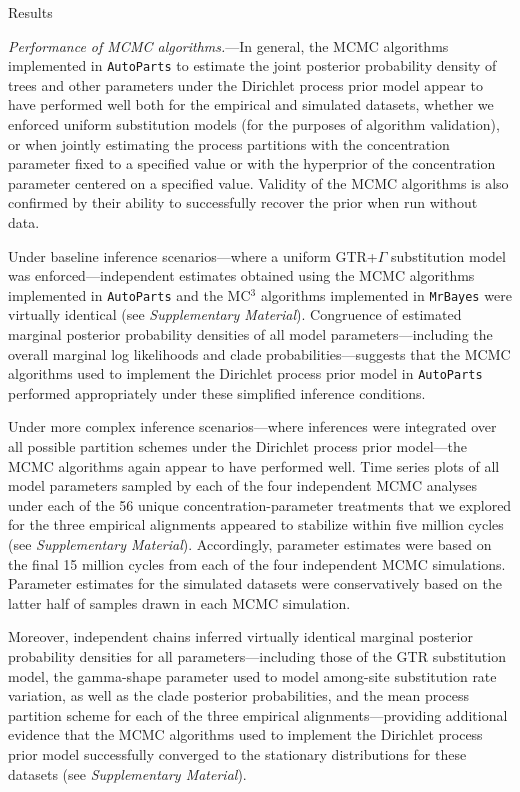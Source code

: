 \documentclass[11pt]{article}
\begin{document}
\bigskip

\begin{center}
{\sc Results}
\end{center}

\noindent
{\it Performance of MCMC algorithms.}---In general, the MCMC algorithms implemented in \verb!AutoParts! to estimate the joint posterior probability density of trees and other parameters under the Dirichlet process prior model appear to have performed well both for the empirical and simulated datasets, whether we enforced uniform substitution models (for the 
purposes of algorithm validation), or when jointly estimating the process partitions with the concentration parameter fixed to a specified value or with the hyperprior of the concentration parameter centered on a specified value.
Validity of the MCMC algorithms is also confirmed by their ability to successfully recover the prior when run without data.

Under baseline inference scenarios---where a uniform GTR+$\Gamma$ substitution model was enforced---independent estimates obtained using the MCMC algorithms implemented in \verb!AutoParts! and the MC$^3$ algorithms implemented in \verb!MrBayes! were virtually identical (see {\it Supplementary Material}).
Congruence of estimated marginal posterior probability densities of all model parameters---including the overall marginal log likelihoods and clade probabilities---suggests that the MCMC algorithms used to implement the Dirichlet process prior model in \verb!AutoParts! performed appropriately under these simplified inference conditions.

Under more complex inference scenarios---where inferences were integrated over all possible partition schemes under the Dirichlet process prior model---the MCMC algorithms again appear to have performed well. 
Time series plots of all model parameters sampled by each of the four independent MCMC analyses under each of the 56 unique concentration-parameter treatments that we explored for the three empirical alignments appeared to stabilize within five million cycles (see {\it Supplementary Material}).
Accordingly, parameter estimates were based on the final 15 million cycles from each of the four independent MCMC simulations.
Parameter estimates for the simulated datasets were conservatively based on the latter half of samples drawn in each MCMC simulation.

Moreover, independent chains inferred virtually identical marginal posterior probability densities for all parameters---including those of the GTR substitution model, the gamma-shape parameter used to model among-site substitution rate variation, as well as the clade posterior probabilities, and the mean process partition scheme for each of the three empirical alignments---providing additional evidence that the MCMC algorithms used to implement the Dirichlet process prior model successfully converged to the stationary distributions for these datasets (see {\it Supplementary Material}). 
\end{document}
